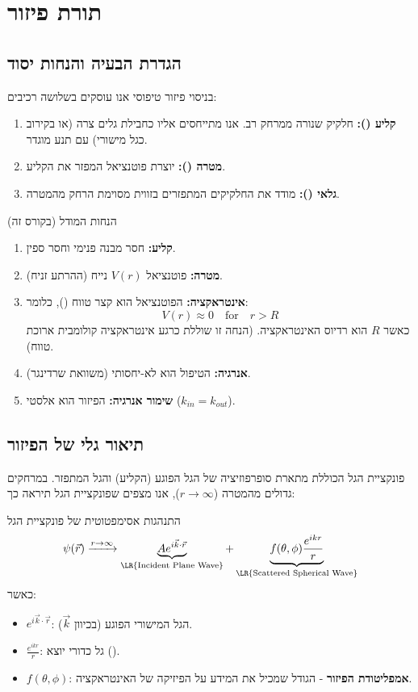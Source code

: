 \section{תורת פיזור }


\subsection*{הגדרת הבעיה והנחות יסוד}

בניסוי פיזור טיפוסי אנו עוסקים בשלושה רכיבים:
\begin{enumerate}
    \item \textbf{קליע ():} חלקיק שנורה ממרחק רב. אנו מתייחסים אליו כחבילת גלים צרה (או בקירוב כגל מישורי) עם תנע מוגדר.
    \item \textbf{מטרה ():} יוצרת פוטנציאל המפזר את הקליע.
    \item \textbf{גלאי ():} מודד את החלקיקים המתפזרים בזווית מסוימת הרחק מהמטרה.
\end{enumerate}

\begin{mainbox}{הנחות המודל (בקורס זה)}
\begin{enumerate}
    \item \textbf{קליע:} חסר מבנה פנימי וחסר ספין.
    \item \textbf{מטרה:} פוטנציאל $V(r)$ נייח (ההרתע זניח).
    \item \textbf{אינטראקציה:} הפוטנציאל הוא קצר טווח (), כלומר:
    $$ V(r) \approx 0 \quad \text{for} \quad r > R $$
    כאשר $R$ הוא רדיוס האינטראקציה. (הנחה זו שוללת כרגע אינטראקציה קולומבית ארוכת טווח).
    \item \textbf{אנרגיה:} הטיפול הוא לא-יחסותי (משוואת שרדינגר).
    \item \textbf{שימור אנרגיה:} הפיזור הוא אלסטי ($k_{in} = k_{out}$).
\end{enumerate}
\end{mainbox}

\subsection*{תיאור גלי של הפיזור}

פונקציית הגל הכוללת מתארת סופרפוזיציה של הגל הפוגע (הקליע) והגל המתפזר.
במרחקים גדולים מהמטרה ($r \to \infty$), אנו מצפים שפונקציית הגל תיראה כך:

\begin{formulabox}{התנהגות אסימפטוטית של פונקציית הגל}
$$ \psi(\vec{r}) \xrightarrow{r \to \infty} \underbrace{A e^{i\vec{k}\cdot\vec{r}}}_{\text{\LR{Incident Plane Wave}}} + \underbrace{f(\theta, \phi) \frac{e^{ikr}}{r}}_{\text{\LR{Scattered Spherical Wave}}} $$
כאשר:
\begin{itemize}
    \item $e^{i\vec{k}\cdot\vec{r}}$: הגל המישורי הפוגע (בכיוון $\vec{k}$).
    \item $\frac{e^{ikr}}{r}$: גל כדורי יוצא ().
    \item $f(\theta, \phi)$: \textbf{אמפליטודת הפיזור} - הגודל שמכיל את המידע על הפיזיקה של האינטראקציה.
\end{itemize}
\end{formulabox}

